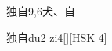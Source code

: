 \begin{entry}{独自}{9,6}{⽝、⾃}
  \begin{phonetics}{独自}{du2 zi4}[][HSK 4]
  \end{phonetics}
\end{entry}
